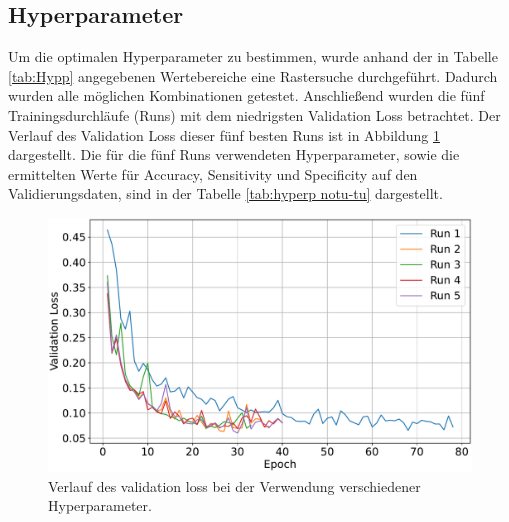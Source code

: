 \subsection{Hyperparameter}
Um die optimalen Hyperparameter zu bestimmen, wurde anhand der in Tabelle \ref{tab:Hypp} angegebenen Wertebereiche eine Rastersuche durchgeführt.
Dadurch wurden alle möglichen Kombinationen getestet.
Anschließend wurden die fünf Trainingsdurchläufe (Runs) mit dem niedrigsten Validation Loss betrachtet.
Der Verlauf des Validation Loss dieser fünf besten Runs ist in Abbildung \ref{fig:val_loss notu-tu} dargestellt.
Die für die fünf Runs verwendeten Hyperparameter, sowie die ermittelten Werte für Accuracy, Sensitivity und Specificity auf den Validierungsdaten,
sind in der Tabelle \ref{tab:hyperp notu-tu} dargestellt.
\begin{figure}[H]
  \centering
  \includegraphics[scale=0.3]{plots/Val_loss_noTu_Tu.pdf}
  \caption{Verlauf des validation loss bei der Verwendung verschiedener Hyperparameter.}
  \label{fig:val_loss notu-tu}
\end{figure}
\begin{table}[H]
    \centering
  \caption{Die fünf Runs mit dem niedrigsten validation loss sowie deren verwendete Hyperparameter und aufgezeichnete Metriken.}
  \label{tab:hyperp notu-tu}
\end{table}
